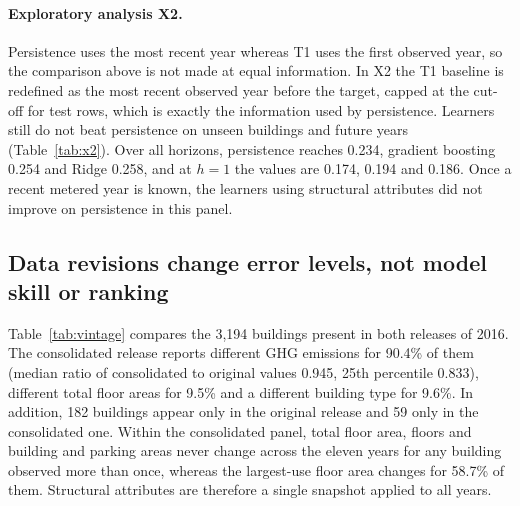 \documentclass[11pt]{article}
\begin{document}
\paragraph{Exploratory analysis X2.} Persistence uses the most recent year whereas T1 uses the first observed year, so the comparison above is not made at equal information. In X2 the T1 baseline is redefined as the most recent observed year before the target, capped at the cut-off for test rows, which is exactly the information used by persistence. Learners still do not beat persistence on unseen buildings and future years (Table~\ref{tab:x2}). Over all horizons, persistence reaches 0.234, gradient boosting 0.254 and Ridge 0.258, and at $h=1$ the values are 0.174, 0.194 and 0.186. Once a recent metered year is known, the learners using structural attributes did not improve on persistence in this panel.

\begin{table}[t]
\centering\small
\caption{Exploratory analysis X2. T1 with the most recent prior year as baseline, on unseen buildings and future years (S4). MAE on the log scale.}
\label{tab:x2}

\end{table}

\subsection{Data revisions change error levels, not model skill or ranking}
\label{sec:res-vintage}

Table~\ref{tab:vintage} compares the 3{,}194 buildings present in both releases of 2016. The consolidated release reports different GHG emissions for 90.4\% of them (median ratio of consolidated to original values 0.945, 25th percentile 0.833), different total floor areas for 9.5\% and a different building type for 9.6\%. In addition, 182 buildings appear only in the original release and 59 only in the consolidated one. Within the consolidated panel, total floor area, floors and building and parking areas never change across the eleven years for any building observed more than once, whereas the largest-use floor area changes for 58.7\% of them. Structural attributes are therefore a single snapshot applied to all years.

\begin{table}[t]
\centering\small
\caption{Revisions between the original 2016 release and the 2016 records of the consolidated release, for buildings matched on their identifier.}
\label{tab:vintage}

\end{table}
\end{document}
